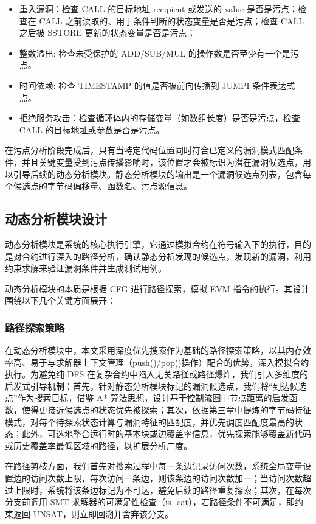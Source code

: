 \documentclass[print, master, vlined, timesmath]{DissertUESTC}
\begin{document}
\begin{itemize}
    \item 重入漏洞：检查 CALL 的目标地址 recipient 或发送的 value 是否是污点；检查在 CALL 之前读取的、用于条件判断的状态变量是否是污点；检查 CALL 之后被 SSTORE 更新的状态变量是否是污点；
    \item 整数溢出: 检查未受保护的 ADD/SUB/MUL 的操作数是否至少有一个是污点。
    \item 时间依赖: 检查 TIMESTAMP 的值是否被前向传播到 JUMPI 条件表达式点。
    \item 拒绝服务攻击：检查循环体内的存储变量（如数组长度）是否是污点，检查 CALL 的目标地址或参数是否是污点。
\end{itemize}

在污点分析阶段完成后，只有当特定代码位置同时符合已定义的漏洞模式匹配条件，并且关键变量受到污点传播影响时，该位置才会被标识为潜在漏洞候选点，用以引导后续的动态分析模块。静态分析模块的输出是一个漏洞候选点列表，包含每个候选点的字节码偏移量、函数名、污点源信息。

\subsection{动态分析模块设计}

动态分析模块是系统的核心执行引擎，它通过模拟合约在符号输入下的执行，目的是对合约进行深入的路径分析，确认静态分析发现的候选点，发现新的漏洞，利用约束求解来验证漏洞条件并生成测试用例。

动态分析模块的本质是根据 CFG 进行路径探索，模拟 EVM 指令的执行。其设计围绕以下几个关键方面展开：

\subsubsection{路径探索策略}
在动态分析模块中，本文采用深度优先搜索作为基础的路径探索策略，以其内存效率高、易于与求解器上下文管理（push()/pop()操作）配合的优势，深入模拟合约执行。为避免纯 DFS 在复杂合约中陷入无关路径或路径爆炸，我们引入多维度的启发式引导机制：首先，针对静态分析模块标记的漏洞候选点，我们将“到达候选点”作为搜索目标，借鉴 A* 算法思想，设计基于控制流图中节点距离的启发函数，使得更接近候选点的状态优先被探索；其次，依据第三章中提炼的字节码特征模式，对每个待探索状态计算与漏洞特征的匹配度，并优先调度匹配度最高的状态；此外，可选地整合运行时的基本块或边覆盖率信息，优先探索能够覆盖新代码或历史覆盖率最低区域的路径，以扩展分析广度。  

在路径剪枝方面，我们首先对搜索过程中每一条边记录访问次数，系统全局变量设置边的访问次数上限，每次访问一条边，则该条边的访问次数加一；当访问次数超过上限时，系统将该条边标记为不可达，避免后续的路径重复探索；其次，在每次分支前调用 SMT 求解器的可满足性检查（is\_sat），若路径条件不可满足，即约束返回 UNSAT，则立即回溯并舍弃该分支。  
\end{document}
